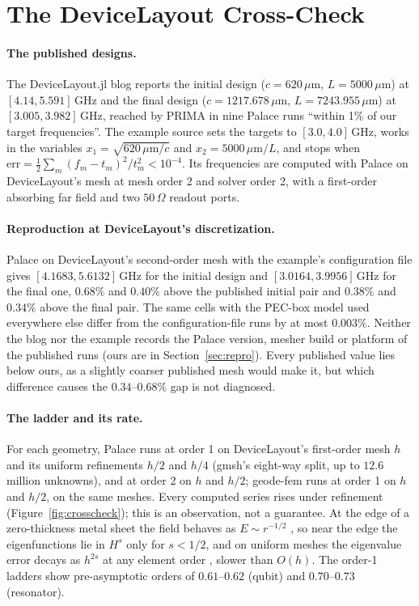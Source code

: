 \documentclass{anvil-paper}
\begin{document}
\section{The DeviceLayout Cross-Check}
\label{sec:crosscheck}

\paragraph{The published designs.}
The DeviceLayout.jl blog \citep{devicelayout-blog} reports the initial
design ($c = 620\,\mu$m, $L = 5000\,\mu$m) at $[4.14, 5.591]$\,GHz and
the final design ($c = 1217.678\,\mu$m, $L = 7243.955\,\mu$m) at
$[3.005, 3.982]$\,GHz, reached by PRIMA in nine Palace runs ``within 1\% of
our target frequencies''. The example source \citep{devicelayout-example}
sets the targets to $[3.0, 4.0]$\,GHz, works in the variables $x_1 =
\sqrt{620\,\mu\mathrm{m}/c}$ and $x_2 = 5000\,\mu\mathrm{m}/L$, and stops
when $\mathrm{err} = \frac12\sum_m (f_m - t_m)^2/t_m^2 < 10^{-4}$. Its
frequencies are computed with Palace on DeviceLayout's mesh at mesh order 2
and solver order 2, with a first-order absorbing far field and two
$50\,\Omega$ readout ports.

\paragraph{Reproduction at DeviceLayout's discretization.}
Palace on DeviceLayout's second-order mesh with the example's
configuration file gives $[4.1683, 5.6132]$\,GHz for the initial design
and $[3.0164, 3.9956]$\,GHz for the final one, $0.68\%$ and $0.40\%$
above the published initial pair and $0.38\%$ and $0.34\%$ above the
final pair. The same cells with the PEC-box model used everywhere else
differ from the configuration-file runs by at most $0.003\%$. Neither the
blog nor the example records the Palace version, mesher build or platform
of the published runs (ours are in Section~\ref{sec:repro}). Every published value lies
below ours, as a slightly coarser published mesh would make it, but which
difference causes the $0.34$--$0.68\%$ gap is not diagnosed.

\paragraph{The ladder and its rate.}
For each geometry, Palace runs at order 1 on DeviceLayout's first-order
mesh $h$ and its uniform refinements $h/2$ and $h/4$ (gmsh's eight-way
split, up to $12.6$ million unknowns), and at order 2 on $h$ and $h/2$;
geode-fem runs at order 1 on $h$ and $h/2$, on the same meshes. Every
computed series rises under refinement (Figure~\ref{fig:crosscheck}); this
is an observation, not a guarantee. At the edge of a zero-thickness metal
sheet the field behaves as $E \sim r^{-1/2}$ \citep{meixner1972behavior},
so near the edge the eigenfunctions lie in $H^{s}$ only for $s < 1/2$, and
on uniform meshes the eigenvalue error decays as $h^{2s}$ at any element
order \citep{boffi2010finite}, slower than $O(h)$. The order-1
ladders show pre-asymptotic orders of $0.61$--$0.62$ (qubit) and $0.70$--$0.73$
(resonator).
\end{document}
